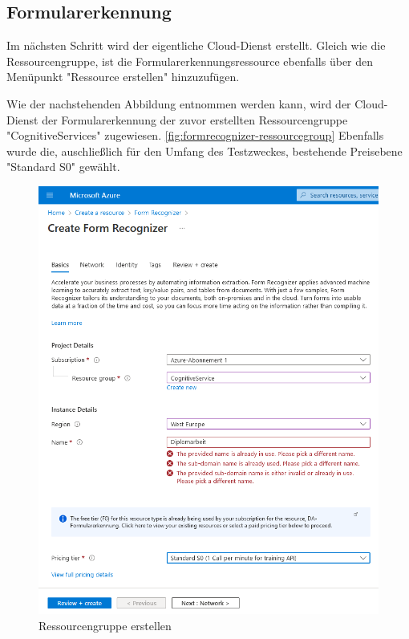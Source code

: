 \subsection{Formularerkennung}
Im nächsten Schritt wird der eigentliche Cloud-Dienst erstellt. Gleich wie die Ressourcengruppe, ist die Formularerkennungsressource ebenfalls über 
den Menüpunkt "Ressource erstellen" hinzuzufügen.

Wie der nachstehenden Abbildung entnommen werden kann, wird der Cloud-Dienst der Formularerkennung der zuvor erstellten Ressourcengruppe "CognitiveServices"
zugewiesen. \ref{fig:formrecognizer-ressourcegroup}
Ebenfalls wurde die, auschließlich für den Umfang des Testzweckes, bestehende Preisebene "Standard S0" gewählt.


\begin{figure}[h]
    \centering
    \includegraphics[scale=0.6]{sections/cloud-computing/images/formrecognizer.png}
    \caption{Ressourcengruppe erstellen}
    \label{fig:kimldl-comparison}
\end{figure}

